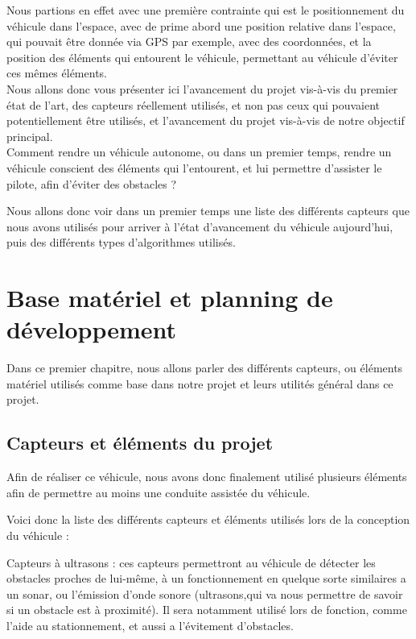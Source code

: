\documentclass[a4paper, 12pt]{book}
\begin{document}
Nous partions en effet avec une première contrainte qui est le positionnement du véhicule dans l'espace, avec de prime abord une position relative dans l'espace, qui pouvait être donnée via GPS par exemple, avec des coordonnées, et la position des éléments qui entourent le véhicule, permettant au véhicule d'éviter ces mêmes éléments.
\\

Nous allons donc vous présenter ici l'avancement du projet vis-à-vis du premier état de l'art, des capteurs réellement utilisés, et non pas ceux qui pouvaient potentiellement être utilisés, et l'avancement du projet vis-à-vis de notre objectif principal.\\

Comment rendre un véhicule autonome, ou dans un premier temps, rendre un véhicule conscient des éléments qui l'entourent, et lui permettre d'assister le pilote, afin d'éviter des obstacles ?

Nous allons donc voir dans un premier temps une liste des différents capteurs que nous avons utilisés pour arriver à l'état d'avancement du véhicule aujourd'hui, puis des différents types d'algorithmes utilisés.

\chapter{Base matériel et planning de développement}
Dans ce premier chapitre, nous allons parler des différents capteurs, ou éléments matériel utilisés comme base dans notre projet et leurs utilités général dans ce projet.

\section{Capteurs et éléments du projet}
Afin de réaliser ce véhicule, nous avons donc finalement utilisé plusieurs éléments afin de permettre au moins une conduite assistée du véhicule.

Voici donc la liste des différents capteurs et éléments utilisés lors de la conception du véhicule :

Capteurs à ultrasons : ces capteurs permettront au véhicule de détecter les obstacles proches de lui-même, à un fonctionnement en quelque sorte similaires a un sonar, ou l’émission d’onde sonore (ultrasons,qui va nous permettre de savoir si un obstacle est à proximité). Il sera notamment utilisé lors de fonction, comme l'aide au stationnement, et aussi a l'évitement d'obstacles.
\end{document}
